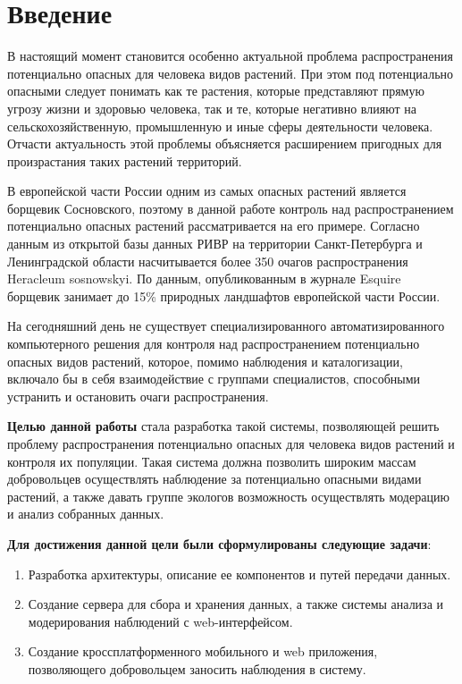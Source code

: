 \section{Введение}
\tab
В настоящий момент становится особенно актуальной проблема распространения потенциально опасных для человека видов растений.
При этом под потенциально опасными следует понимать как те растения, которые представляют прямую угрозу жизни и здоровью человека, так и те, которые негативно влияют на сельскохозяйственную, промышленную и иные сферы деятельности человека\cite{alien-plants}.
Отчасти актуальность этой проблемы объясняется расширением пригодных для произрастания таких растений территорий\cite{invasive-plants, poisonous-ivy}.

\nwln
В европейской части России одним из самых опасных растений является борщевик Сосновского\cite{heracleum}, поэтому в данной работе контроль над распространением потенциально опасных растений рассматривается на его примере.
Согласно данным из открытой базы данных РИВР\cite{rivr} на территории Санкт-Петербурга и Ленинградской области насчитывается более 350 очагов распространения Heracleum sosnowskyi.
По данным, опубликованным в журнале Esquire\cite{esquire} борщевик занимает до 15\% природных ландшафтов европейской части России.

\nwln
На сегодняшний день не существует специализированного автоматизированного компьютерного решения для контроля над распространением потенциально опасных видов растений, которое, помимо наблюдения и каталогизации, включало бы в себя взаимодействие с группами специалистов, способными устранить и остановить очаги распространения.

\nwln
\textbf{Целью данной работы} стала разработка такой системы, позволяющей решить проблему распространения потенциально опасных для человека видов растений и контроля их популяции.
Такая система должна позволить широким массам добровольцев осуществлять наблюдение за потенциально опасными видами растений, а также давать группе экологов возможность осуществлять модерацию и анализ собранных данных.

\nwln
\textbf{Для достижения данной цели были сформулированы следующие задачи}:
\begin{enumerate}[topsep=0pt, parsep=0pt, itemsep=0pt, wide=0.5cm]
	\item Разработка архитектуры, описание ее компонентов и путей передачи данных.
	\item Создание сервера для сбора и хранения данных, а также системы анализа и модерирования наблюдений с web-интерфейсом.
	\item Создание кроссплатформенного мобильного и web приложения, позволяющего добровольцем заносить наблюдения в систему.
\end{enumerate}

